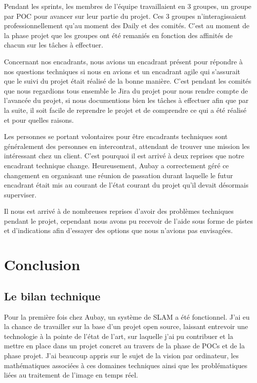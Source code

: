 \documentclass[11pt]{article}
\begin{document}
      Pendant les sprints, les membres de l'équipe travaillaient en 3 groupes, un groupe par POC pour avancer 
      sur leur partie du projet. Ces 3 groupes n'interagissaient professionnellement qu'au moment des Daily
      et des comités. C'est au moment de la phase projet que les groupes ont été remaniés en fonction des
      affinités de chacun sur les tâches à effectuer.

      Concernant nos encadrants, nous avions un encadrant présent pour répondre à nos questions 
      techniques si nous en avions et un encadrant agile qui s'assurait que le suivi du projet était réalisé 
      de la bonne manière. C'est pendant les comités que nous regardions tous ensemble le Jira du projet pour nous
      rendre compte de l'avancée du projet, si nous documentions bien les tâches à effectuer afin que par la suite, 
      il soit facile de reprendre le projet et de comprendre ce qui a été réalisé et pour quelles raisons.

      \pagebreak

      Les personnes se portant volontaires pour être encadrants techniques sont généralement des personnes en
      intercontrat, attendant de trouver une mission les intéressant chez un client. C'est pourquoi il est 
      arrivé à deux reprises que notre encadrant technique change. Heureusement, Aubay a correctement géré 
      ce changement en organisant une réunion de passation durant laquelle le futur encadrant était mis au 
      courant de l'état courant du projet qu'il devait désormais superviser.

      Il nous est arrivé à de nombreuses reprises d'avoir des problèmes techniques pendant le projet, cependant 
      nous avons pu recevoir de l'aide sous forme de pistes et d'indications afin d'essayer des options que 
      nous n'avions pas envisagées.

  \pagebreak

  \section{Conclusion}

    \subsection{Le bilan technique}
      Pour la première fois chez Aubay, un système de SLAM a été fonctionnel. J'ai eu la chance de travailler sur la base d'un 
      projet open source, laissant entrevoir une technologie à la pointe de l'état de l'art, sur laquelle j'ai pu contribuer et la 
      mettre en place dans un projet concret au travers de la phase de POCs et de la phase projet. J'ai beaucoup appris sur le
      sujet de la vision par ordinateur, les mathématiques associées à ces domaines techniques ainsi que les problématiques 
      liées au traitement de l'image en temps réel.
\end{document}
